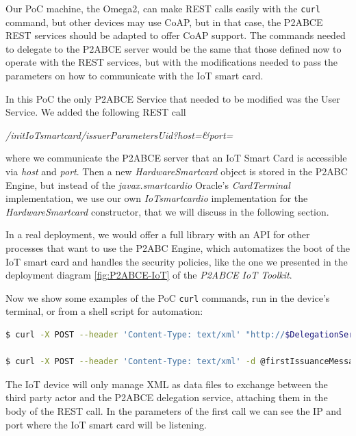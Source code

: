 Our PoC machine, the Omega2, can make REST calls easily with the \texttt{curl} command, but other devices may use \ac{CoAP}, but in that case, the P2ABCE REST services should be adapted to offer CoAP support. The commands needed to delegate to the P2ABCE server would be the same that those defined now to operate with the REST services, but with the modifications needed to pass the parameters on how to communicate with the IoT smart card.

In this PoC the only P2ABCE Service that needed to be modified was the User Service. We added the following REST call

\begin{center}
	\textit{/initIoTsmartcard/{issuerParametersUid}?host=\&port=}
\end{center}

where we communicate the P2ABCE server that an IoT Smart Card is accessible via \textit{host} and \textit{port}. Then a new \textit{HardwareSmartcard} object is stored in the P2ABC Engine, but instead of the \textit{javax.smartcardio} Oracle's \textit{CardTerminal} implementation, we use our own \textit{IoTsmartcardio} implementation for the \textit{HardwareSmartcard} constructor, that we will discuss in the following section.


\hfil

In a real deployment, we would offer a full library with an API for other processes that want to use the P2ABC Engine, which automatizes the boot of the IoT smart card and handles the security policies, like the one we presented in the deployment diagram \ref{fig:P2ABCE-IoT} of the \textit{P2ABCE IoT Toolkit}.

Now we show some examples of the PoC \texttt{curl} commands, run in the device's terminal, or from a shell script for automation:

\begin{lstlisting}[language=bash]
$ curl -X POST --header 'Content-Type: text/xml' "http://$DelegationServerIP:9200/user/initIoTsmartcard/http%3A%2F%2Fticketcompany%2FMyFavoriteSoccerTeam%2Fissuance%3Aidemix?host=192.168.3.1&port=8888"

$ curl -X POST --header 'Content-Type: text/xml' -d @firstIssuanceMessage.xml "http://$DelegationServerIP:9200/user/issuanceProtocolStep/" > issuanceReturn.xml
\end{lstlisting}

The IoT device will only manage XML as data files to exchange between the third party actor and the P2ABCE delegation service, attaching them in the body of the REST call. In the parameters of the first call we can see the IP and port where the IoT smart card will be listening.



